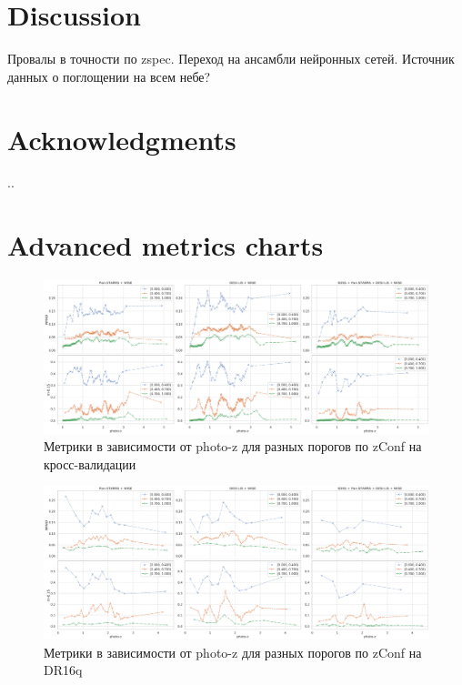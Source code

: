 \documentclass[fleqn,usenatbib]{mnras}
\begin{document}
\section{Discussion}

Провалы в точности по zspec. Переход на ансамбли нейронных сетей. Источник данных о поглощении на всем небе?

\section*{Acknowledgments}
..




\appendix

\section{Advanced metrics charts}

\begin{landscape}
\begin{figure}
    \centering
    \includegraphics[width=25cm]{images/metrics-adv-photoz-x-zconf-cv2.png}
    \caption{Метрики в зависимости от photo-z для разных порогов по zConf на кросс-валидации}
    \label{fig:my_label}
\end{figure}
\end{landscape}


\begin{landscape}
\begin{figure}
    \centering
    \includegraphics[width=0.9\linewidth]{images/metrics-adv-photoz-x-zconf-dr16q.png}
    \caption{Метрики в зависимости от photo-z для разных порогов по zConf на DR16q}
    \label{fig:my_label}
\end{figure}
\end{landscape}
\end{document}
